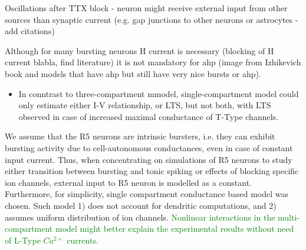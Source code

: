\documentclass[../main.tex]{subfiles}
\begin{document}
\color{black}


    


Oscillations after TTX block - neuron might receive external input from other sources
than synaptic current (e.g. gap junctions to other neurons or astrocytes - add citations)

Although for many bursting neurons H current is necessary (blocking of H current blabla, find literature)
it is not mandatory for \gls{ahp} (image from Izhikevich book and models that have ahp but still
have very nice bursts or ahp).

\begin{itemize}
    \item In conntrast to three-compartment mmodel, single-compartment model could only estimate either I-V relationship, or LTS, but not both,
    with LTS observed in case of increased maximal conductance of T-Type channels. \cite{destexheDendriticLowthresholdCalcium1998}
\end{itemize}


We assume that the R5 neurons are intrinsic bursters, i.e. they can exhibit bursting activity due to
cell-autonomous conductances, even in case of constant input current.
Thus, when concentrating on simulations of R5 neurons to study either transition between
bursting and tonic spiking or effects of blocking specific ion channels, external input to R5 neuron
is modelled as a constant. Furthermore, for simplicity, single compartment conductance based model was chosen.
Such model 1) does not account for dendritic computations, and 2) assumes uniform distribution of
ion channels. \textcolor{green}{Nonlinear interactions in the multi-compartment model might better explain
the experimental results without need of L-Type $Ca^{2+}$ currents.}
\end{document}
